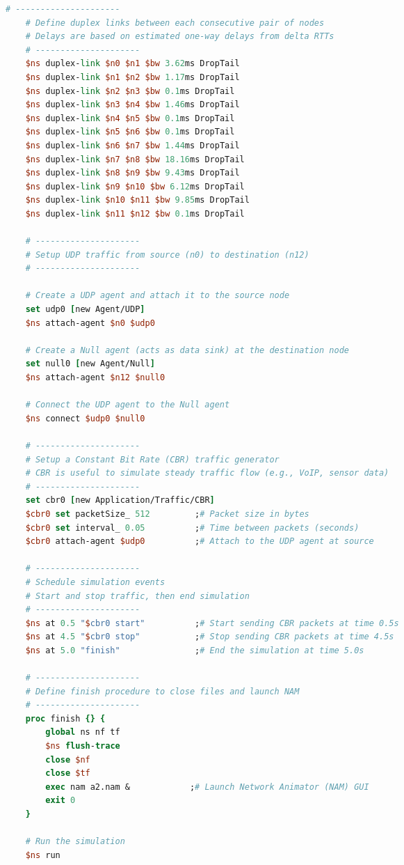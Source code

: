 \documentclass[12pt]{article}
\begin{document}
\begin{adjustwidth}{-3em}{-3em}
\begin{lstlisting}[language=tcl]
	# ---------------------
	# Define duplex links between each consecutive pair of nodes
	# Delays are based on estimated one-way delays from delta RTTs
	# ---------------------
	$ns duplex-link $n0 $n1 $bw 3.62ms DropTail
	$ns duplex-link $n1 $n2 $bw 1.17ms DropTail
	$ns duplex-link $n2 $n3 $bw 0.1ms DropTail
	$ns duplex-link $n3 $n4 $bw 1.46ms DropTail
	$ns duplex-link $n4 $n5 $bw 0.1ms DropTail
	$ns duplex-link $n5 $n6 $bw 0.1ms DropTail
	$ns duplex-link $n6 $n7 $bw 1.44ms DropTail
	$ns duplex-link $n7 $n8 $bw 18.16ms DropTail
	$ns duplex-link $n8 $n9 $bw 9.43ms DropTail
	$ns duplex-link $n9 $n10 $bw 6.12ms DropTail
	$ns duplex-link $n10 $n11 $bw 9.85ms DropTail
	$ns duplex-link $n11 $n12 $bw 0.1ms DropTail
	
	# ---------------------
	# Setup UDP traffic from source (n0) to destination (n12)
	# ---------------------
	
	# Create a UDP agent and attach it to the source node
	set udp0 [new Agent/UDP]
	$ns attach-agent $n0 $udp0
	
	# Create a Null agent (acts as data sink) at the destination node
	set null0 [new Agent/Null]
	$ns attach-agent $n12 $null0
	
	# Connect the UDP agent to the Null agent
	$ns connect $udp0 $null0
	
	# ---------------------
	# Setup a Constant Bit Rate (CBR) traffic generator
	# CBR is useful to simulate steady traffic flow (e.g., VoIP, sensor data)
	# ---------------------
	set cbr0 [new Application/Traffic/CBR]
	$cbr0 set packetSize_ 512         ;# Packet size in bytes
	$cbr0 set interval_ 0.05          ;# Time between packets (seconds)
	$cbr0 attach-agent $udp0          ;# Attach to the UDP agent at source
	
	# ---------------------
	# Schedule simulation events
	# Start and stop traffic, then end simulation
	# ---------------------
	$ns at 0.5 "$cbr0 start"          ;# Start sending CBR packets at time 0.5s
	$ns at 4.5 "$cbr0 stop"           ;# Stop sending CBR packets at time 4.5s
	$ns at 5.0 "finish"               ;# End the simulation at time 5.0s
	
	# ---------------------
	# Define finish procedure to close files and launch NAM
	# ---------------------
	proc finish {} {
		global ns nf tf
		$ns flush-trace
		close $nf
		close $tf
		exec nam a2.nam &            ;# Launch Network Animator (NAM) GUI
		exit 0
	}
	
	# Run the simulation
	$ns run
	
	\end{lstlisting}
	\end{adjustwidth}
	
\end{document}
